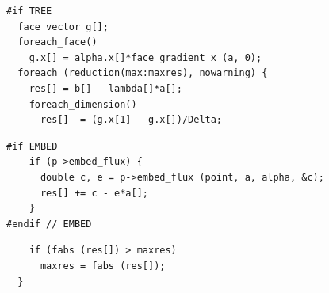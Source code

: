 \documentclass[a4paper]{article}
\newcommand{\para}[1]{\textbf{\emph{\textcolor{para}{#1}}}}
\begin{document}
\begin{multicols}{2}
  \columnbreak
  \begin{verbatim}
#if TREE
  face vector g[];
  foreach_face()
    g.x[] = alpha.x[]*face_gradient_x (a, 0);
  foreach (reduction(max:maxres), nowarning) {
    res[] = b[] - lambda[]*a[];
    foreach_dimension()
      res[] -= (g.x[1] - g.x[])/Delta;
  \end{verbatim}
\end{multicols}

\begin{center}
\end{center}

\begin{multicols}{2}
  \columnbreak
  \begin{verbatim}
#if EMBED
    if (p->embed_flux) {
      double c, e = p->embed_flux (point, a, alpha, &c);
      res[] += c - e*a[];
    }
#endif // EMBED 
  \end{verbatim}
\end{multicols}

\begin{center}
\end{center}

\begin{multicols}{2}
  \columnbreak
  \begin{verbatim}
    if (fabs (res[]) > maxres)
      maxres = fabs (res[]);
  }
  \end{verbatim}
\end{multicols}
\end{document}
